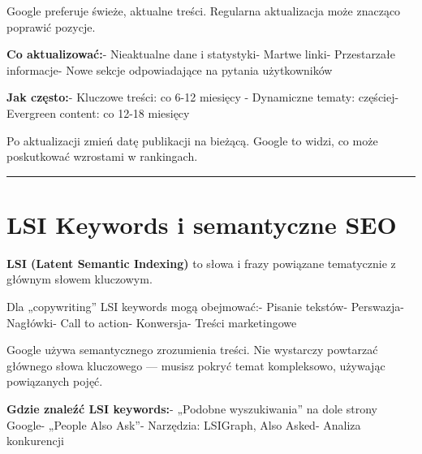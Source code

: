 \documentclass[
  12pt,
  a4paper,
  twoside,
  openright,
  12pt,
  DIV=12,
  BCOR=12mm]{scrbook}
\newcommand{\decoline}{%
  \begin{center}
    \textcolor{bordergray}{\rule{0.3\textwidth}{0.5pt}}
  \end{center}
}
\begin{document}
Google preferuje świeże, aktualne treści. Regularna aktualizacja może
znacząco poprawić pozycje.

\textbf{Co aktualizować:}\newline - Nieaktualne dane i
statystyki\newline - Martwe linki\newline - Przestarzałe
informacje\newline - Nowe sekcje odpowiadające na pytania użytkowników

\textbf{Jak często:}\newline - Kluczowe treści: co 6-12 miesięcy\newline
- Dynamiczne tematy: częściej\newline - Evergreen content: co 12-18
miesięcy

\begin{wskazowka}
Po aktualizacji zmień datę publikacji na bieżącą. Google to widzi, co może poskutkować wzrostami w rankingach.
\end{wskazowka}

\decoline

\section{LSI Keywords i semantyczne
SEO}\label{lsi-keywords-i-semantyczne-seo}

\textbf{LSI (Latent Semantic Indexing)} to słowa i frazy powiązane
tematycznie z głównym słowem kluczowym.

Dla „copywriting'' LSI keywords mogą obejmować:\newline - Pisanie
tekstów\newline - Perswazja\newline - Nagłówki\newline - Call to
action\newline - Konwersja\newline - Treści marketingowe

\begin{wazne}
Google używa semantycznego zrozumienia treści. Nie wystarczy powtarzać głównego słowa kluczowego --- musisz pokryć temat kompleksowo, używając powiązanych pojęć.
\end{wazne}

\textbf{Gdzie znaleźć LSI keywords:}\newline - „Podobne wyszukiwania''
na dole strony Google\newline - „People Also Ask''\newline - Narzędzia:
LSIGraph, Also Asked\newline - Analiza konkurencji
\end{document}
